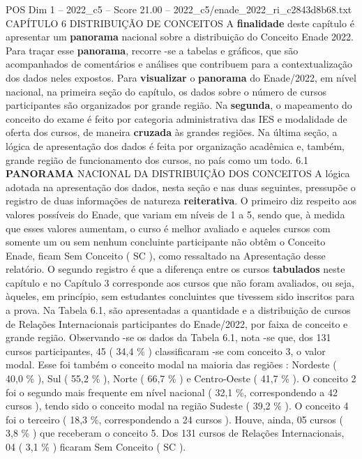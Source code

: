 \begin{textsample}{POS Dim 1 – 2022\_c5 – Score 21.00 – 2022\_c5/enade\_2022\_ri\_c2843d8b68.txt}  \label{ex:f1_pos_021}
CAPÍTULO 6 DISTRIBUIÇÃO DE CONCEITOS A \textbf{finalidade} deste capítulo é apresentar um \textbf{panorama} nacional sobre a distribuição do Conceito Enade 2022.
Para traçar esse \textbf{panorama}, recorre -se a tabelas e gráficos, que são acompanhados de comentários e análises que contribuem para a contextualização dos dados neles expostos.
Para \textbf{visualizar} o \textbf{panorama} do Enade/2022, em nível nacional, na primeira seção do capítulo, os dados sobre o número de cursos participantes são organizados por grande região.
Na \textbf{segunda}, o mapeamento do conceito do exame é feito por categoria administrativa das IES e modalidade de oferta dos cursos, de maneira \textbf{cruzada} às grandes regiões.
Na última seção, a lógica de apresentação dos dados é feita por organização acadêmica e, também, grande região de funcionamento dos cursos, no país como um todo. 6.1 \textbf{PANORAMA} NACIONAL DA DISTRIBUIÇÃO DOS CONCEITOS A lógica adotada na apresentação dos dados, nesta seção e nas duas seguintes, pressupõe o registro de duas informações de natureza \textbf{reiterativa}.
O primeiro diz respeito aos valores possíveis do Enade, que variam em níveis de 1 a 5, sendo que, à medida que esses valores aumentam, o curso é melhor avaliado e aqueles cursos com somente um ou sem nenhum concluinte participante não obtêm o Conceito Enade, ficam Sem Conceito ( SC ), como ressaltado na Apresentação desse relatório.
O segundo registro é que a diferença entre os cursos \textbf{tabulados} neste capítulo e no Capítulo 3 corresponde aos cursos que não foram avaliados, ou seja, àqueles, em princípio, sem estudantes concluintes que tivessem sido inscritos para a prova.
Na Tabela 6.1, são apresentadas a quantidade e a distribuição de cursos de Relações Internacionais participantes do Enade/2022, por faixa de conceito e grande região.
Observando -se os dados da Tabela 6.1, nota -se que, dos 131 cursos participantes, 45 ( 34,4 \% ) classificaram -se com conceito 3, o valor modal.
Esse foi também o conceito modal na maioria das regiões : Nordeste ( 40,0 \% ), Sul ( 55,2 \% ), Norte ( 66,7 \% ) e Centro-Oeste ( 41,7 \% ).
O conceito 2 foi o segundo mais frequente em nível nacional ( 32,1 \%, correspondendo a 42 cursos ), tendo sido o conceito modal na região Sudeste ( 39,2 \% ).
O conceito 4 foi o terceiro ( 18,3 \%, correspondendo a 24 cursos ).
Houve, ainda, 05 cursos ( 3,8 \% ) que receberam o conceito 5.
Dos 131 cursos de Relações Internacionais, 04 ( 3,1 \% ) ficaram Sem Conceito ( SC ).

\end{textsample}
